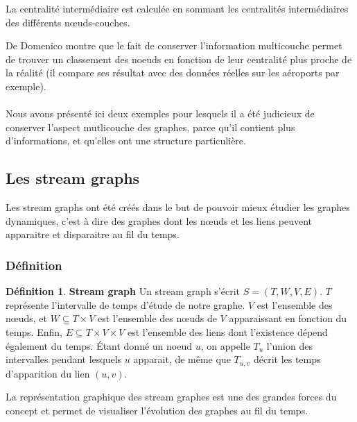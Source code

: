 \documentclass[11pt,a4paper]{article}
\theoremstyle{definition}
\newtheorem{defn}{Définition}
\theoremstyle{remark}
\theoremstyle{remark}
\begin{document}
La centralité intermédiaire est calculée en sommant les centralités intermédiaires des différents nœuds-couches.

De Domenico montre que le fait de conserver l'information multicouche permet de trouver un classement des noeuds en fonction de leur centralité plus proche de la réalité (il compare ses résultat avec des données réelles sur les aéroports par exemple).

\paragraph{}

Nous avons présenté ici deux exemples pour lesquels il a été judicieux de conserver l'aspect mutlicouche des graphes, parce qu'il contient plus d'informations, et qu'elles ont une structure particulière.


\subsection{Les stream graphs}



Les stream graphs ont été créés dans le but de pouvoir mieux étudier les graphes dynamiques, c'est à dire des graphes dont les nœuds et les liens peuvent apparaitre et disparaitre au fil du temps.

\subsubsection{Définition}

\begin{defn}{\textbf{Stream graph}}
Un stream graph s'écrit $S=(T,W,V,E)$. $T$ représente l'intervalle de temps d'étude de notre graphe. $V$ est l'ensemble des nœuds, et $W \subseteq T \times V$ est l'ensemble des nœuds de $V$ apparaissant en fonction du temps. Enfin, $E \subseteq T \times V \times V$ est l'ensemble des liens dont l'existence dépend également du temps. Étant donné un noeud $u$, on appelle $T_u$ l'union des intervalles pendant lesquels $u$ apparait, de même que $T_{u,v}$ décrit les temps d'apparition du lien $(u,v)$.
\end{defn}

La représentation graphique des stream graphes est une des grandes forces du concept et permet de visualiser l'évolution des graphes au fil du temps.
\end{document}
